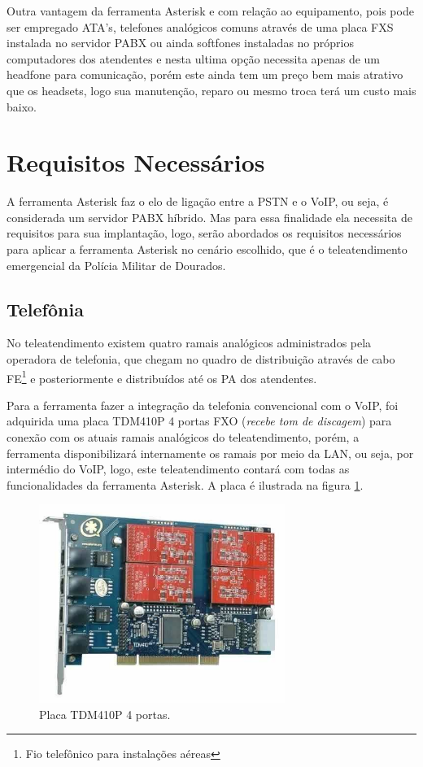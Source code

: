 Outra vantagem da ferramenta Asterisk e com relação ao equipamento, pois pode ser empregado ATA's, telefones analógicos comuns através de uma placa FXS instalada no servidor PABX ou ainda softfones instaladas no próprios computadores dos atendentes e nesta ultima opção necessita apenas de um headfone para comunicação, porém este ainda tem um preço bem mais atrativo que os headsets, logo sua manutenção, reparo ou mesmo troca terá um custo mais baixo.

\section{Requisitos Necessários}
A ferramenta Asterisk faz o elo de ligação entre a PSTN e o VoIP, ou seja, é considerada um servidor PABX híbrido. Mas para essa finalidade ela necessita de requisitos para sua implantação, logo, serão abordados os requisitos necessários para aplicar a ferramenta Asterisk no cenário escolhido, que é o teleatendimento emergencial da Polícia Militar de Dourados.

\subsection{Telefônia}
No teleatendimento existem quatro ramais analógicos administrados pela operadora de telefonia, que chegam no quadro de distribuição através de cabo FE\footnote{Fio telefônico para instalações aéreas} e posteriormente e distribuídos até os PA dos atendentes.

Para a ferramenta fazer a integração da telefonia convencional com o VoIP, foi adquirida uma placa TDM410P 4 portas FXO (\textit{recebe tom de discagem}) para conexão com os atuais ramais analógicos do teleatendimento, porém, a ferramenta disponibilizará internamente os ramais por meio da LAN, ou seja, por intermédio do VoIP, logo, este teleatendimento contará com todas as funcionalidades da ferramenta Asterisk. A placa é ilustrada na figura \ref{Figura16}.

\begin{figure}[h]
	\centering
	\includegraphics[width=8cm]{imagens/tdm410p.jpg}
	\caption{Placa TDM410P 4 portas.}
    \label{Figura16}
\end{figure}

